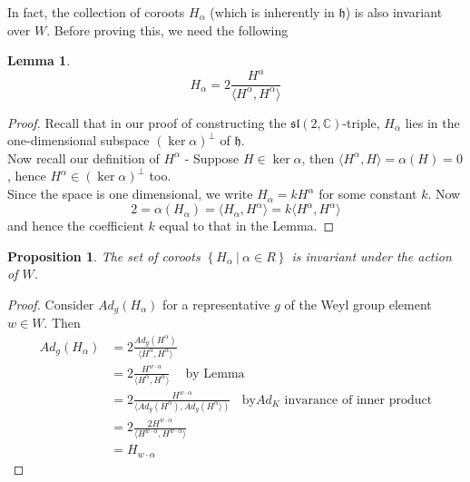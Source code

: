 \documentclass[11pt]{book}
\newtheorem{lemma}[theorem]{Lemma}
\newtheorem{proposition}[theorem]{Proposition}
\newcommand{\bb}[1]{\mathbb{#1}}
\newcommand{\mf}[1]{\mathfrak{#1}}
\begin{document}
In fact, the collection of coroots $H_{\alpha}$ (which is inherently in $\mf{h}$) is also invariant over $W$. Before proving this, we need the following
\begin{lemma} \label{halpha}
$$H_{\alpha} = 2\frac{H^{\alpha}}{\langle H^{\alpha}, H^{\alpha} \rangle}$$
\end{lemma}
\begin{proof}
Recall that in our proof of constructing the $\mf{sl}(2,\bb{C})$-triple, $H_{\alpha}$ lies in the one-dimensional subspace $(\ker \alpha)^{\perp}$ of $\mf{h}$.\\
Now recall our definition of $H^{\alpha}$ - Suppose $H \in \ker \alpha$, then $\langle H^{\alpha}, H \rangle = \alpha(H) = 0$, hence $H^{\alpha} \in (\ker \alpha)^{\perp}$ too.\\
Since the space is one dimensional, we write $H_{\alpha} = kH^{\alpha}$ for some constant $k$. Now
$$2 = \alpha(H_{\alpha}) = \langle H_{\alpha}, H^{\alpha} \rangle = k \langle H^{\alpha}, H^{\alpha} \rangle$$
and hence the coefficient $k$ equal to that in the Lemma.
\end{proof}

\begin{proposition}
The set of coroots $\left\{ H_{\alpha}\ \Big|\ \alpha \in R\right\}$ is invariant under the action of $W$.\\
\end{proposition}
\begin{proof}
Consider $Ad_g(H_{\alpha})$ for a representative $g$ of the Weyl group element $w \in W$. Then
\begin{align*}
Ad_g(H_{\alpha}) &= 2 \frac{Ad_g(H^{\alpha})}{\langle H^{\alpha}, H^{\alpha} \rangle}\\
&= 2\frac{H^{w\cdot \alpha}}{\langle H^{\alpha}, H^{\alpha} \rangle} \ \ \ \ \text{      by Lemma}\\
&= 2\frac{H^{w\cdot \alpha}}{\langle Ad_g(H^{\alpha}), Ad_g(H^{\alpha} \rangle)} \ \ \ \ \text{by}Ad_K \text{ invarance of inner product}\\
&= 2\frac{2H^{w\cdot \alpha}}{\langle H^{w\cdot \alpha}, H^{w \cdot \alpha} \rangle}\\
&= H_{w \cdot \alpha}
\end{align*}
\end{proof}
\end{document}
